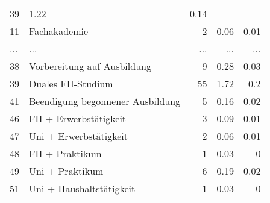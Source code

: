 \begin{longtable}{lXrrr}
          \num{39} &
          \num[round-mode=places,round-precision=2]{1,22} &
          \num[round-mode=places,round-precision=2]{0,14} \\
        11 & \multicolumn{1}{X}{Fachakademie} & %
          \num{2} &
          \num[round-mode=places,round-precision=2]{0,06} &
          \num[round-mode=places,round-precision=2]{0,01} \\
       ... & ... & ... & ... & ... \\
        38 & \multicolumn{1}{X}{Vorbereitung auf Ausbildung} & %
          \num{9} &
          \num[round-mode=places,round-precision=2]{0,28} &
          \num[round-mode=places,round-precision=2]{0,03} \\

        39 & \multicolumn{1}{X}{Duales FH-Studium} & %
          \num{55} &
          \num[round-mode=places,round-precision=2]{1,72} &
          \num[round-mode=places,round-precision=2]{0,2} \\

        41 & \multicolumn{1}{X}{Beendigung begonnener Ausbildung} & %
          \num{5} &
          \num[round-mode=places,round-precision=2]{0,16} &
          \num[round-mode=places,round-precision=2]{0,02} \\

        46 & \multicolumn{1}{X}{FH + Erwerbstätigkeit} & %
          \num{3} &
          \num[round-mode=places,round-precision=2]{0,09} &
          \num[round-mode=places,round-precision=2]{0,01} \\

        47 & \multicolumn{1}{X}{Uni + Erwerbstätigkeit} & %
          \num{2} &
          \num[round-mode=places,round-precision=2]{0,06} &
          \num[round-mode=places,round-precision=2]{0,01} \\

        48 & \multicolumn{1}{X}{FH + Praktikum} & %
          \num{1} &
          \num[round-mode=places,round-precision=2]{0,03} &
          \num[round-mode=places,round-precision=2]{0} \\

        49 & \multicolumn{1}{X}{Uni + Praktikum} & %
          \num{6} &
          \num[round-mode=places,round-precision=2]{0,19} &
          \num[round-mode=places,round-precision=2]{0,02} \\

        51 & \multicolumn{1}{X}{Uni + Haushaltstätigkeit} & %
          \num{1} &
          \num[round-mode=places,round-precision=2]{0,03} &
          \num[round-mode=places,round-precision=2]{0} \\


\end{longtable}
